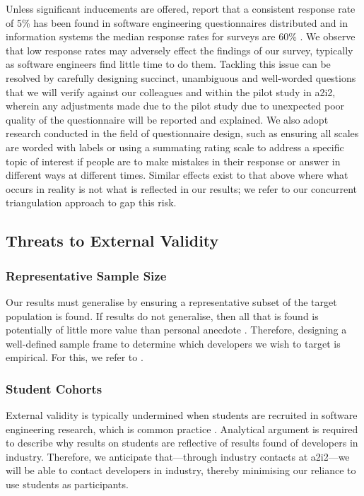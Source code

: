 Unless significant inducements are offered, \citet{Singer:2007tu} report that a consistent response rate of 5\% has been found in software engineering questionnaires distributed and in information systems the median response rates for surveys are 60\% \citep{Baruch:1999vf}. We observe that low response rates may adversely effect the findings of our survey, typically as software engineers find little time to do them. Tackling this issue can be resolved by carefully designing succinct, unambiguous and well-worded questions that we will verify against our colleagues and within the pilot study in \gls{a2i2}, wherein any adjustments made due to the pilot study due to unexpected poor quality of the questionnaire will be reported and explained. We also adopt research conducted in the field of questionnaire design, such as ensuring all scales are worded with labels \citep{Krosnick:1999wt} or using a summating rating scale \citep{Spector:1992uj} to address a specific topic of interest if people are to make mistakes in their response or answer in different ways at different times. Similar effects exist to that above where what occurs in reality is not what is reflected in our results; we refer to our concurrent triangulation approach to gap this risk.

\subsection{Threats to External Validity}

\subsubsection{Representative Sample Size}

Our results must generalise by ensuring a representative subset of the target population is found. If results do not generalise, then all that is found is potentially of little more value than personal anecdote \citep{Kitchenham:2007ux}. Therefore, designing a well-defined sample frame to determine which developers we wish to target is empirical. For this, we refer to \citet{Kitchenham:2007ux}.

\subsubsection{Student Cohorts}

External validity is typically undermined when students are recruited in software engineering research, which is common practice \citep{Easterbrook:2007ws}. Analytical argument is required to describe why results on students are reflective of results found of developers in industry. Therefore, we anticipate that---through industry contacts at \gls{a2i2}---we will be able to contact developers in industry, thereby minimising our reliance to use students as participants. 

